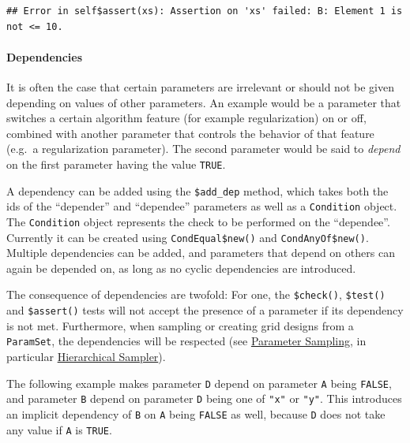 \documentclass[
]{scrbook}
\newenvironment{Shaded}{\begin{snugshade}}{\end{snugshade}}
\newcommand{\ConstantTok}[1]{\textcolor[rgb]{0.00,0.00,0.00}{#1}}
\newcommand{\FunctionTok}[1]{\textcolor[rgb]{0.00,0.00,0.00}{#1}}
\newcommand{\NormalTok}[1]{#1}
\newcommand{\SpecialCharTok}[1]{\textcolor[rgb]{0.00,0.00,0.00}{#1}}
\newcommand{\StringTok}[1]{\textcolor[rgb]{0.31,0.60,0.02}{#1}}
\renewenvironment{Shaded} {\begin{snugshade}\small} {\end{snugshade}}
\begin{document}
\begin{verbatim}
## Error in self$assert(xs): Assertion on 'xs' failed: B: Element 1 is not <= 10.
\end{verbatim}

\hypertarget{dependencies}{%
\paragraph{Dependencies}\label{dependencies}}

It is often the case that certain parameters are irrelevant or should not be given depending on values of other parameters.
An example would be a parameter that switches a certain algorithm feature (for example regularization) on or off, combined with another parameter that controls the behavior of that feature (e.g.~a regularization parameter).
The second parameter would be said to \emph{depend} on the first parameter having the value \texttt{TRUE}.

A dependency can be added using the \texttt{\$add\_dep} method, which takes both the ids of the ``depender'' and ``dependee'' parameters as well as a \texttt{Condition} object.
The \texttt{Condition} object represents the check to be performed on the ``dependee''.
Currently it can be created using \texttt{CondEqual\$new()} and \texttt{CondAnyOf\$new()}.
Multiple dependencies can be added, and parameters that depend on others can again be depended on, as long as no cyclic dependencies are introduced.

The consequence of dependencies are twofold:
For one, the \texttt{\$check()}, \texttt{\$test()} and \texttt{\$assert()} tests will not accept the presence of a parameter if its dependency is not met.
Furthermore, when sampling or creating grid designs from a \texttt{ParamSet}, the dependencies will be respected (see \protect\hyperlink{parameter-sampling}{Parameter Sampling}, in particular \protect\hyperlink{hierarchical-sampler}{Hierarchical Sampler}).

The following example makes parameter \texttt{D} depend on parameter \texttt{A} being \texttt{FALSE}, and parameter \texttt{B} depend on parameter \texttt{D} being one of \texttt{"x"} or \texttt{"y"}.
This introduces an implicit dependency of \texttt{B} on \texttt{A} being \texttt{FALSE} as well, because \texttt{D} does not take any value if \texttt{A} is \texttt{TRUE}.

\begin{Shaded}
\end{Shaded}
\end{document}
